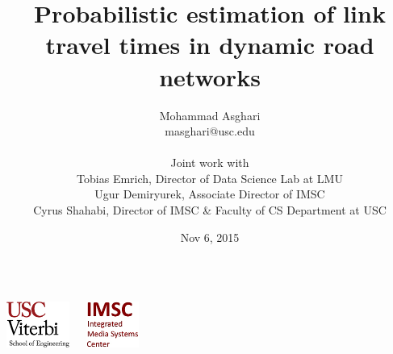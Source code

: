 \documentclass[t]{beamer}
\begin{document}
\graphicspath{ {../Manuscript/figures/}{Graphics/} }

\title[USC Viterbi School of Engineering]{Probabilistic estimation of link travel times in dynamic road networks}  
\author[Mohammad Asghari]{Mohammad Asghari\\
\small{masghari@usc.edu}\\
\vspace{0.05in}
\begin{flushleft}
\tiny{
\hspace{1.25in}Joint work with\\
\hspace{1.25in}Tobias Emrich, Director of Data Science Lab at LMU\\
\hspace{1.25in}Ugur Demiryurek, Associate Director of IMSC\\
\hspace{1.25in}Cyrus Shahabi, Director of IMSC \& Faculty of CS Department at USC}
\end{flushleft}}

\date{Nov 6, 2015} 
\begin{frame}
\titlepage
\vspace{-0.5in}
\begin{columns}
  \begin{center}
    \includegraphics[height=1.5cm]{viterbi_logo.jpg}
  \end{center}
  \begin{center}
    \includegraphics[height=1.5cm]{imsc_logo.jpg}   
  \end{center}
\end{columns} 
\end{frame}
\end{document}
